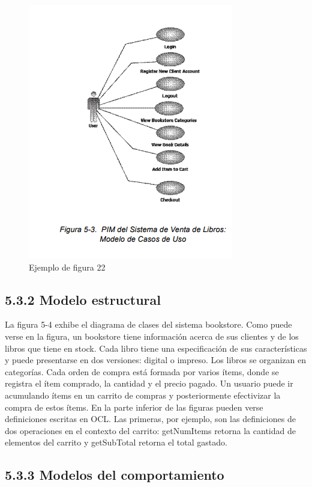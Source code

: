 \begin{figure}[H]
\centering
\includegraphics[scale=0.9]{./Imagenes/modelo22}
\caption{Ejemplo de figura 22}
\label{figura22}
\end{figure}


\subsection{5.3.2 Modelo estructural }

La figura 5-4 exhibe el diagrama de clases del sistema bookstore. Como puede verse en la figura, un bookstore tiene información acerca de sus clientes y de los libros que tiene en stock. Cada libro tiene una especificación de sus características y puede presentarse en dos versiones: digital o impreso. Los libros se organizan en categorías. Cada orden de compra está formada por varios ítems, donde se registra el ítem comprado, la cantidad y el precio pagado. Un usuario puede ir acumulando ítems en un carrito de compras y posteriormente efectivizar la compra de estos ítems. En la parte inferior de las figuras pueden verse definiciones escritas en OCL. Las primeras, por ejemplo, son las definiciones de dos operaciones en el contexto del carrito: getNumItems retorna la cantidad de elementos del carrito y getSubTotal retorna el total gastado.



\subsection{5.3.3 Modelos del comportamiento }

